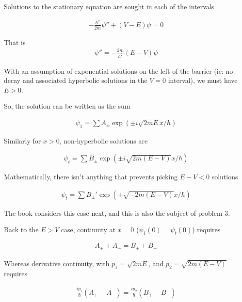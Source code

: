 Solutions to the stationary equation are sought in each of the intervals

\begin{align}
-\frac{\hbar^2}{2m}\psi'' + (V-E)\psi = 0
\end{align}

That is
\begin{align}
\psi'' = - \frac{2m}{\hbar^2} (E-V)\psi
\end{align}

With an assumption of exponential solutions on the left of the barrier
(ie: no decay and associated hyperbolic solutions in the $V=0$ interval),
we must have $E>0$.

So, the solution can be written as the sum

\begin{align*}
\psi_1 = \sum A_{\pm} \exp\left( \pm i \sqrt{2mE} x / \hbar \right)
\end{align*}

Similarly for $x>0$, non-hyperbolic solutions are

\begin{align*}
\psi_t = \sum B_{\pm} \exp\left( \pm i \sqrt{2m(E-V)} x / \hbar \right)
\end{align*}

Mathematically, there isn't anything that prevents picking $E-V <0$ solutions

\begin{align*}
\psi_t = \sum B_{\pm}' \exp\left( \pm \sqrt{-2m(E-V)} x / \hbar \right)
\end{align*}

The book considers this case next, and this is also the subject of 
problem 3.

Back to the $E>V$ case, continuity at $x=0$ ($\psi_1(0) = \psi_t(0)$) requires

\begin{align*}
A_{+} + A_{-} = B_{+} + B_{-}
\end{align*}

Whereas derivative continuity, with $p_1 = \sqrt{2mE}$, and $p_2 = \sqrt{2m (E-V)}$ requires

\begin{align*}
\frac{i p_1}{\hbar} (A_{+} - A_{-}) = \frac{i p_2}{\hbar} (B_{+} - B_{-})
\end{align*}

